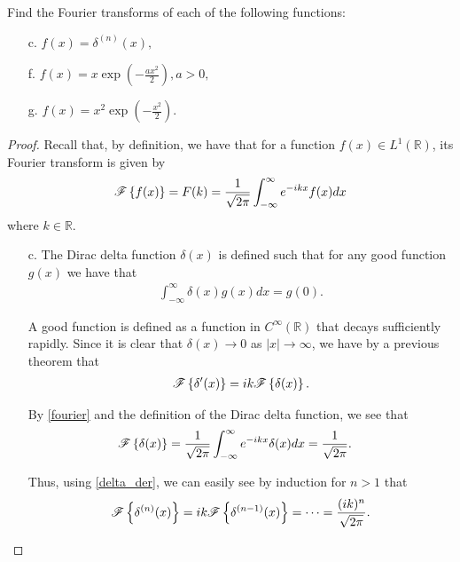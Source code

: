 \begin{problem}{2.1}
  Find the Fourier transforms of each of the following functions:
  \begin{enumerate}
    \item [c.] $f(x) = \delta ^{(n)}(x),$
    \item [f.] $\displaystyle f(x) = x \exp \left( -\frac{a x^2}{2} \right), a > 0,$
    \item [g.] $\displaystyle f(x) = x^2 \exp \left( -\frac{x^2}{2} \right).$
  \end{enumerate}
\end{problem}

\begin{proof}
  Recall that, by definition, we have that for a function $f(x) \in L^1(\mathbb{R})$,
  its Fourier transform is given by
  \begin{align}\label{fourier}
    \mathscr{F}\left\{ {f(x)} \right\} = F(k) = \frac{1}{\sqrt{2 \pi}} \int_{-\infty}^{\infty} e^{-ikx}f(x) dx
  \end{align}
  where $k\in\mathbb{R}$.

  \begin{enumerate}
    \item [c.] The Dirac delta function $\delta(x)$ is defined such that for any good function $g(x)$ we have that
      \begin{align*}
        \int_{-\infty}^{\infty} \delta(x) g(x) dx = g(0).
      \end{align*}

      A good function is defined as a function in $C^{\infty}(\mathbb{R})$ that decays sufficiently rapidly.
      Since it is clear that $\delta(x) \to 0$ as $|x| \to \infty$, we have by a previous theorem that
      \begin{align}\label{delta_der}
        \mathscr{F}\left\{ {\delta'(x)} \right\} = ik \mathscr{F}\left\{ {\delta(x)} \right\}.
      \end{align}

      By \eqref{fourier} and the definition of the Dirac delta function, we see that
      \begin{align*}
        \mathscr{F}\left\{ {\delta(x)} \right\} &= \frac{1}{\sqrt{2\pi}}\int_{-\infty}^{\infty} e^{- i k x}\delta(x) dx = \frac{1}{\sqrt{2\pi}}.
      \end{align*}

      Thus, using \eqref{delta_der}, we can easily see by induction for $n > 1$ that
      \begin{align*}
        \mathscr{F}\left\{ {\delta^{(n)}(x)} \right\} = ik \mathscr{F}\left\{ {\delta^{(n-1)}(x)} \right\} = \dots = \frac{(ik)^n}{\sqrt{2 \pi}}.
      \end{align*}


\end{enumerate}
\end{proof}
